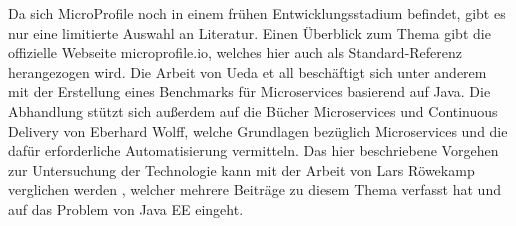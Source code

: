 Da sich MicroProfile noch in einem frühen Entwicklungsstadium befindet, gibt es nur eine limitierte Auswahl an Literatur. Einen Überblick zum Thema gibt die offizielle Webseite microprofile.io, welches hier auch als Standard-Referenz herangezogen wird. Die Arbeit von Ueda et all beschäftigt sich unter anderem mit der Erstellung eines Benchmarks für Microservices basierend auf Java. Die Abhandlung stützt sich außerdem auf die Bücher Microservices \cite{EberhardWolff.2015} und Continuous Delivery \cite{EberhardWolff.2016} von Eberhard Wolff, welche Grundlagen bezüglich Microservices und die dafür erforderliche Automatisierung vermitteln. Das hier beschriebene Vorgehen zur Untersuchung der Technologie kann mit der Arbeit von Lars Röwekamp verglichen werden \cite{LarsRowekamp.2016}, welcher mehrere Beiträge zu diesem Thema verfasst hat und auf das Problem von Java EE eingeht. 





